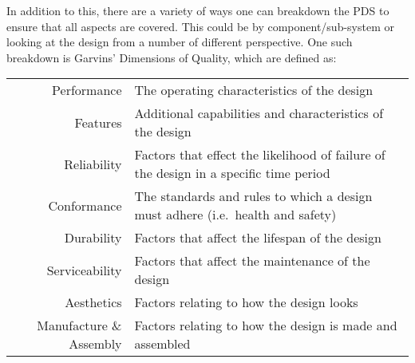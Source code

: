  In addition to this, there are a variety of ways one can breakdown the \ac{PDS} to ensure that all aspects are covered. This could be by component/sub-system or looking at the design from a number of different perspective. One such breakdown is Garvins' Dimensions of Quality\cite{garvin1987}, which are defined as:

\begin{table}
    \small
    \begin{tabular}{r p{}}
        Performance & The operating characteristics of the design \\
        Features & Additional capabilities and characteristics of the design \\
        Reliability & Factors that effect the likelihood of failure of the design in a specific time period \\
        Conformance & The standards and rules to which a design must adhere (i.e.\ health and safety) \\
        Durability & Factors that affect the lifespan of the design \\
        Serviceability & Factors that affect the maintenance of the design \\
        Aesthetics & Factors relating to how the design looks \\
        Manufacture \& Assembly & Factors relating to how the design is made and assembled \\
    \end{tabular}
\end{table}